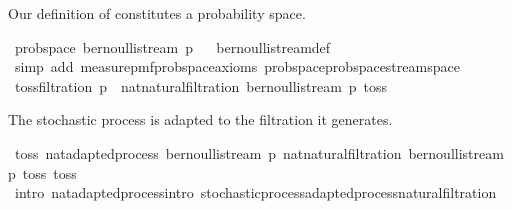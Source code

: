 \begin{isabellebody}
\endisatagproof
{\isafoldproof}%
%
\isadelimproof
%
\endisadelimproof
%
\begin{isamarkuptext}%
Our definition of  constitutes a probability space.%
\end{isamarkuptext}\isamarkuptrue%
\isamarkupfalse%
\ prob{\isacharunderscore}{\kern0pt}space\ {\isachardoublequoteopen}bernoulli{\isacharunderscore}{\kern0pt}stream\ p{\isachardoublequoteclose}%
\isadelimproof
\ %
\endisadelimproof
%
\isatagproof
{}\isamarkupfalse%
\ bernoulli{\isacharunderscore}{\kern0pt}stream{\isacharunderscore}{\kern0pt}def\ \isamarkupfalse%
\ {\isacharparenleft}{\kern0pt}simp\ add{\isacharcolon}{\kern0pt}\ measure{\isacharunderscore}{\kern0pt}pmf{\isachardot}{\kern0pt}prob{\isacharunderscore}{\kern0pt}space{\isacharunderscore}{\kern0pt}axioms\ prob{\isacharunderscore}{\kern0pt}space{\isachardot}{\kern0pt}prob{\isacharunderscore}{\kern0pt}space{\isacharunderscore}{\kern0pt}stream{\isacharunderscore}{\kern0pt}space{\isacharparenright}{\kern0pt}%
\endisatagproof
{\isafoldproof}%
%
\isadelimproof
%
\endisadelimproof
\isanewline
\isanewline
{}\isamarkupfalse%
\ {\isachardoublequoteopen}toss{\isacharunderscore}{\kern0pt}filtration\ p\ {\isasymequiv}\ nat{\isacharunderscore}{\kern0pt}natural{\isacharunderscore}{\kern0pt}filtration\ {\isacharparenleft}{\kern0pt}bernoulli{\isacharunderscore}{\kern0pt}stream\ p{\isacharparenright}{\kern0pt}\ toss{\isachardoublequoteclose}%
\begin{isamarkuptext}%
The stochastic process  is adapted to the filtration it generates.%
\end{isamarkuptext}\isamarkuptrue%
\isamarkupfalse%
\ toss{\isacharcolon}{\kern0pt}\ nat{\isacharunderscore}{\kern0pt}adapted{\isacharunderscore}{\kern0pt}process\ {\isachardoublequoteopen}bernoulli{\isacharunderscore}{\kern0pt}stream\ p{\isachardoublequoteclose}\ {\isachardoublequoteopen}nat{\isacharunderscore}{\kern0pt}natural{\isacharunderscore}{\kern0pt}filtration\ {\isacharparenleft}{\kern0pt}bernoulli{\isacharunderscore}{\kern0pt}stream\ p{\isacharparenright}{\kern0pt}\ toss{\isachardoublequoteclose}\ toss\ \isanewline
%
\isadelimproof
\ \ %
\endisadelimproof
%
\isatagproof
{}\isamarkupfalse%
\ {\isacharparenleft}{\kern0pt}intro\ nat{\isacharunderscore}{\kern0pt}adapted{\isacharunderscore}{\kern0pt}process{\isachardot}{\kern0pt}intro\ stochastic{\isacharunderscore}{\kern0pt}process{\isachardot}{\kern0pt}adapted{\isacharunderscore}{\kern0pt}process{\isacharunderscore}{\kern0pt}natural{\isacharunderscore}{\kern0pt}filtration{\isacharparenright}{\kern0pt}\isanewline

\end{isabellebody}
